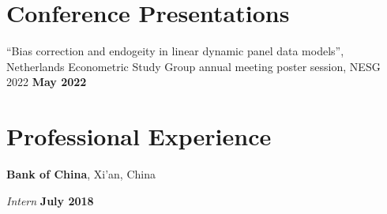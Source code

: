 \documentclass[margin,line]{res}
\newenvironment{list2}{
  \begin{list}{$\bullet$}{%
      \setlength{\itemsep}{0in}
      \setlength{\parsep}{0in} \setlength{\parskip}{0in}
      \setlength{\topsep}{0in} \setlength{\partopsep}{0in} 
      \setlength{\leftmargin}{0.2in}}}{\end{list}}
\begin{document}
\begin{resume}
%

\section{\sc Conference Presentations}
``Bias correction and endogeity in linear dynamic panel data models'', 
Netherlands Econometric Study Group annual meeting poster session, NESG 2022 \hfill {\bf May 2022}
\vspace{-.3cm}


\section{\sc Professional Experience}
{\bf Bank of China}, Xi'an, China

\vspace{-.3cm}
{\em Intern} \hfill {\bf July 2018}\\


\end{resume}
\end{document}
